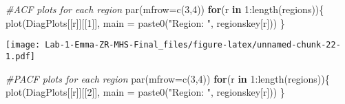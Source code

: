\documentclass[
]{article}
\newenvironment{Shaded}{\begin{snugshade}}{\end{snugshade}}
\newcommand{\AttributeTok}[1]{\textcolor[rgb]{0.77,0.63,0.00}{#1}}
\newcommand{\CommentTok}[1]{\textcolor[rgb]{0.56,0.35,0.01}{\textit{#1}}}
\newcommand{\ConstantTok}[1]{\textcolor[rgb]{0.00,0.00,0.00}{#1}}
\newcommand{\ControlFlowTok}[1]{\textcolor[rgb]{0.13,0.29,0.53}{\textbf{#1}}}
\newcommand{\DecValTok}[1]{\textcolor[rgb]{0.00,0.00,0.81}{#1}}
\newcommand{\FunctionTok}[1]{\textcolor[rgb]{0.00,0.00,0.00}{#1}}
\newcommand{\NormalTok}[1]{#1}
\newcommand{\OtherTok}[1]{\textcolor[rgb]{0.56,0.35,0.01}{#1}}
\newcommand{\SpecialCharTok}[1]{\textcolor[rgb]{0.00,0.00,0.00}{#1}}
\newcommand{\StringTok}[1]{\textcolor[rgb]{0.31,0.60,0.02}{#1}}
\begin{document}
\begin{Shaded}
\end{Shaded}

\begin{Shaded}
\begin{Highlighting}[]
\CommentTok{\#ACF plots for each region}
\FunctionTok{par}\NormalTok{(}\AttributeTok{mfrow=}\FunctionTok{c}\NormalTok{(}\DecValTok{3}\NormalTok{,}\DecValTok{4}\NormalTok{))}
\ControlFlowTok{for}\NormalTok{(r }\ControlFlowTok{in} \DecValTok{1}\SpecialCharTok{:}\FunctionTok{length}\NormalTok{(regions))\{}
  \FunctionTok{plot}\NormalTok{(DiagPlots[[r]][[}\DecValTok{1}\NormalTok{]], }\AttributeTok{main =} \FunctionTok{paste0}\NormalTok{(}\StringTok{"Region: "}\NormalTok{, regionskey[r]))}
\NormalTok{\}}
\end{Highlighting}
\end{Shaded}

\texttt{[image: Lab-1-Emma-ZR-MHS-Final\_files/figure-latex/unnamed-chunk-22-1.pdf]}

\begin{Shaded}
\begin{Highlighting}[]
\CommentTok{\#PACF plots for each region}
\FunctionTok{par}\NormalTok{(}\AttributeTok{mfrow=}\FunctionTok{c}\NormalTok{(}\DecValTok{3}\NormalTok{,}\DecValTok{4}\NormalTok{))}
\ControlFlowTok{for}\NormalTok{(r }\ControlFlowTok{in} \DecValTok{1}\SpecialCharTok{:}\FunctionTok{length}\NormalTok{(regions))\{}
  \FunctionTok{plot}\NormalTok{(DiagPlots[[r]][[}\DecValTok{2}\NormalTok{]], }\AttributeTok{main =} \FunctionTok{paste0}\NormalTok{(}\StringTok{"Region: "}\NormalTok{, regionskey[r]))}
\NormalTok{\}}
\end{Highlighting}
\end{Shaded}
\end{document}
